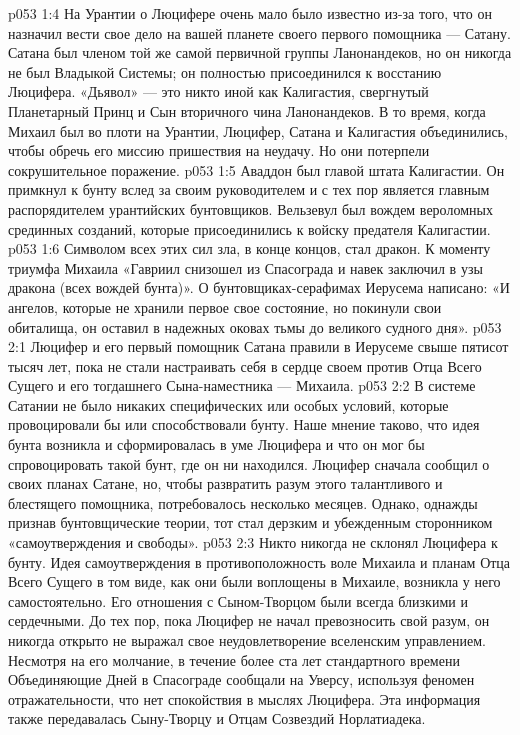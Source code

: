\vs p053 1:4 На Урантии о Люцифере очень мало было известно из\hyp{}за того, что он назначил вести свое дело на вашей планете своего первого помощника --- Сатану. Сатана был членом той же самой первичной группы Ланонандеков, но он никогда не был Владыкой Системы; он полностью присоединился к восстанию Люцифера. «Дьявол» --- это никто иной как Калигастия, свергнутый Планетарный Принц и Сын вторичного чина Ланонандеков. В то время, когда Михаил был во плоти на Урантии, Люцифер, Сатана и Калигастия объединились, чтобы обречь его миссию пришествия на неудачу. Но они потерпели сокрушительное поражение.
\vs p053 1:5 Аваддон был главой штата Калигастии. Он примкнул к бунту вслед за своим руководителем и с тех пор является главным распорядителем урантийских бунтовщиков. Вельзевул был вождем вероломных срединных созданий, которые присоединились к войску предателя Калигастии.
\vs p053 1:6 \pc Символом всех этих сил зла, в конце концов, стал дракон. К моменту триумфа Михаила «Гавриил снизошел из Спасограда и навек заключил в узы дракона (всех вождей бунта)». О бунтовщиках\hyp{}серафимах Иерусема написано: «И ангелов, которые не хранили первое свое состояние, но покинули свои обиталища, он оставил в надежных оковах тьмы до великого судного дня».
\vs p053 2:1 Люцифер и его первый помощник Сатана правили в Иерусеме свыше пятисот тысяч лет, пока не стали настраивать себя в сердце своем против Отца Всего Сущего и его тогдашнего Сына\hyp{}наместника --- Михаила.
\vs p053 2:2 В системе Сатании не было никаких специфических или особых условий, которые провоцировали бы или способствовали бунту. Наше мнение таково, что идея бунта возникла и сформировалась в уме Люцифера и что он мог бы спровоцировать такой бунт, где он ни находился. Люцифер сначала сообщил о своих планах Сатане, но, чтобы развратить разум этого талантливого и блестящего помощника, потребовалось несколько месяцев. Однако, однажды признав бунтовщические теории, тот стал дерзким и убежденным сторонником «самоутверждения и свободы».
\vs p053 2:3 \pc Никто никогда не склонял Люцифера к бунту. Идея самоутверждения в противоположность воле Михаила и планам Отца Всего Сущего в том виде, как они были воплощены в Михаиле, возникла у него самостоятельно. Его отношения с Сыном\hyp{}Творцом были всегда близкими и сердечными. До тех пор, пока Люцифер не начал превозносить свой разум, он никогда открыто не выражал свое неудовлетворение вселенским управлением. Несмотря на его молчание, в течение более ста лет стандартного времени Объединяющие Дней в Спасограде сообщали на Уверсу, используя феномен отражательности, что нет спокойствия в мыслях Люцифера. Эта информация также передавалась Сыну\hyp{}Творцу и Отцам Созвездий Норлатиадека.
